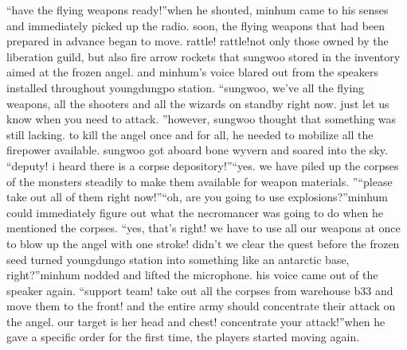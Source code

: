 “have the flying weapons ready!”when he shouted, minhum came to his senses and immediately picked up the radio.
 soon, the flying weapons that had been prepared in advance began to move.
rattle! rattle!not only those owned by the liberation guild, but also fire arrow rockets that sungwoo stored in the inventory aimed at the frozen angel.
and minhum’s voice blared out from the speakers installed throughout youngdungpo station.
“sungwoo, we’ve all the flying weapons, all the shooters and all the wizards on standby right now.
 just let us know when you need to attack.
”however, sungwoo thought that something was still lacking.
 to kill the angel once and for all, he needed to mobilize all the firepower available.
sungwoo got aboard bone wyvern and soared into the sky.
“deputy! i heard there is a corpse depository!”“yes.
 we have piled up the corpses of the monsters steadily to make them available for weapon materials.
”“please take out all of them right now!”“oh, are you going to use explosions?”minhum could immediately figure out what the necromancer was going to do when he mentioned the corpses.
“yes, that’s right! we have to use all our weapons at once to blow up the angel with one stroke! didn’t we clear the quest before the frozen seed turned youngdungo station into something like an antarctic base, right?”minhum nodded and lifted the microphone.
 his voice came out of the speaker again.
“support team! take out all the corpses from warehouse b33 and move them to the front! and the entire army should concentrate their attack on the angel.
 our target is her head and chest! concentrate your attack!”when he gave a specific order for the first time, the players started moving again.

